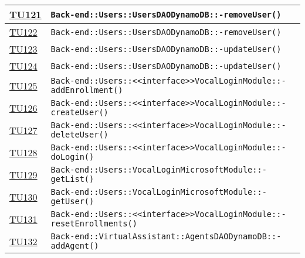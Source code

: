 \begin{longtable}{|>{\centering}m{1cm}|m{12cm}<{\centering}|}
\hyperlink{TU121}{TU121} & \texttt{Back-end::Users::UsersDAODynamoDB::-\linebreak removeUser()}\\ \hline

\hyperlink{TU122}{TU122} & \texttt{Back-end::Users::UsersDAODynamoDB::-\linebreak removeUser()}\\ \hline

\hyperlink{TU123}{TU123} & \texttt{Back-end::Users::UsersDAODynamoDB::-\linebreak updateUser()}\\ \hline

\hyperlink{TU124}{TU124} & \texttt{Back-end::Users::UsersDAODynamoDB::-\linebreak updateUser()}\\ \hline

\hyperlink{TU125}{TU125} & \texttt{Back-end::Users::<<interface>>VocalLoginModule::-\linebreak addEnrollment()}\\ \hline

\hyperlink{TU126}{TU126} & \texttt{Back-end::Users::<<interface>>VocalLoginModule::-\linebreak createUser()}\\ \hline

\hyperlink{TU127}{TU127} & \texttt{Back-end::Users::<<interface>>VocalLoginModule::-\linebreak deleteUser()}\\ \hline

\hyperlink{TU128}{TU128} & \texttt{Back-end::Users::<<interface>>VocalLoginModule::-\linebreak doLogin()}\\ \hline

\hyperlink{TU129}{TU129} & \texttt{Back-end::Users::VocalLoginMicrosoftModule::-\linebreak getList()}\\ \hline

\hyperlink{TU130}{TU130} & \texttt{Back-end::Users::VocalLoginMicrosoftModule::-\linebreak getUser()}\\ \hline

\hyperlink{TU131}{TU131} & \texttt{Back-end::Users::<<interface>>VocalLoginModule::-\linebreak resetEnrollments()}\\ \hline

\hyperlink{TU132}{TU132} & \texttt{Back-end::VirtualAssistant::AgentsDAODynamoDB::-\linebreak addAgent()}\\ \hline


\end{longtable}
